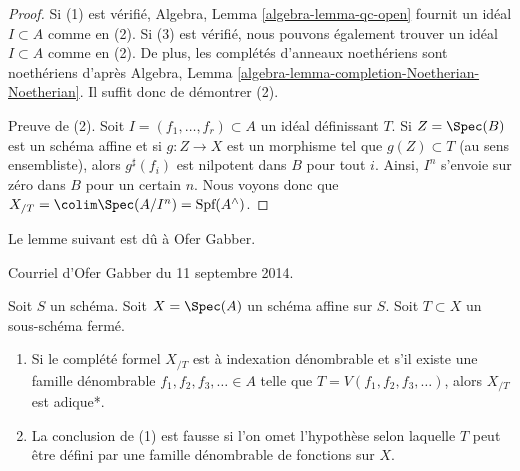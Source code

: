 \begin{proof}
Si (1) est vérifié, Algebra, Lemma \ref{algebra-lemma-qc-open} fournit
un idéal $I \subset A$ comme en (2). Si (3) est vérifié, nous pouvons
également trouver un idéal $I \subset A$ comme en (2). De plus, les complétés
d'anneaux noethériens sont noethériens d'après
Algebra, Lemma \ref{algebra-lemma-completion-Noetherian-Noetherian}.
Il suffit donc de démontrer (2).

\medskip\noindent
Preuve de (2).
Soit $I = (f_1, \ldots, f_r) \subset A$ un idéal définissant $T$.
Si $Z = \Spec(B)$ est un schéma affine et si $g : Z \to X$ est
un morphisme tel que $g(Z) \subset T$ (au sens ensembliste), alors
$g^\sharp(f_i)$ est nilpotent dans $B$ pour tout $i$. Ainsi,
$I^n$ s'envoie sur zéro dans $B$ pour un certain $n$. Nous voyons donc que
$X_{/T} = \colim \Spec(A/I^n) = \text{Spf}(A^\wedge)$.
\end{proof}

\noindent
Le lemme suivant est dû à Ofer Gabber.

\begin{lemma}
\label{lemma-completion-countably-indexed}
\begin{reference}
Courriel d'Ofer Gabber du 11 septembre 2014.
\end{reference}
Soit $S$ un schéma. Soit $X = \Spec(A)$ un schéma affine sur $S$.
Soit $T \subset X$ un sous-schéma fermé.
\begin{enumerate}
\item Si le complété formel $X_{/T}$ est à indexation dénombrable
et s'il existe une famille dénombrable $f_1, f_2, f_3, \ldots \in A$ telle que
$T = V(f_1, f_2, f_3, \ldots)$, alors $X_{/T}$ est adique*.
\item La conclusion de (1) est fausse si l'on omet l'hypothèse selon laquelle
$T$ peut être défini par une famille dénombrable de fonctions sur $X$.
\end{enumerate}
\end{lemma}

